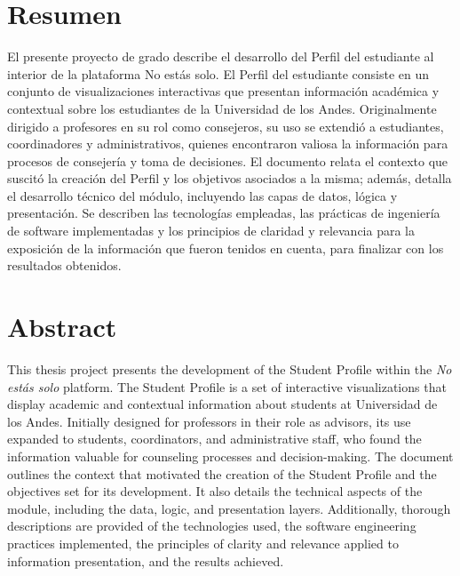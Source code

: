 \section*{\centering Resumen}

El presente proyecto de grado describe el desarrollo del Perfil del estudiante al interior de la plataforma No estás solo. El Perfil del estudiante consiste en un conjunto de visualizaciones interactivas que presentan información académica y contextual sobre los estudiantes de la Universidad de los Andes. Originalmente dirigido a profesores en su rol como consejeros, su uso se extendió a estudiantes, coordinadores y administrativos, quienes encontraron valiosa la información para procesos de consejería y toma de decisiones. El documento relata el contexto que suscitó la creación del Perfil y los objetivos asociados a la misma; además, detalla el desarrollo técnico del módulo, incluyendo las capas de datos, lógica y presentación. Se describen las tecnologías empleadas, las prácticas de ingeniería de software implementadas y los principios de claridad y relevancia para la exposición de la información que fueron tenidos en cuenta, para finalizar con los resultados obtenidos.

\section*{\centering Abstract}

This thesis project presents the development of the Student Profile within the \textit{No estás solo} platform. The Student Profile is a set of interactive visualizations that display academic and contextual information about students at Universidad de los Andes. Initially designed for professors in their role as advisors, its use expanded to students, coordinators, and administrative staff, who found the information valuable for counseling processes and decision-making. The document outlines the context that motivated the creation of the Student Profile and the objectives set for its development. It also details the technical aspects of the module, including the data, logic, and presentation layers. Additionally, thorough descriptions are provided of the technologies used, the software engineering practices implemented, the principles of clarity and relevance applied to information presentation, and the results achieved.